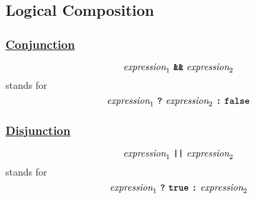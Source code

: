 \subsection*{Logical Composition}

\subsubsection*{\href{https://sourceacademy.org/sicpjs/1.1.6\#p4}{Conjunction}}

\[
\textit{expression}_1 \ \textbf{\texttt{\&\&}} \ \textit{expression}_2
\]
stands for
\[
\textit{expression}_1 \ \textbf{\texttt{?}} \ \textit{expression}_2 \ \textbf{\texttt{:}}\ \textbf{\texttt{false}}
\]

\subsubsection*{\href{https://sourceacademy.org/sicpjs/1.1.6\#p4}{Disjunction}}

\[
\textit{expression}_1 \ \textbf{\texttt{||}} \ \textit{expression}_2
\]
stands for
\[
\textit{expression}_1 \ \textbf{\texttt{?}}\ \textbf{\texttt{true}}\  \textbf{\texttt{:}}\ \textit{expression}_2
\]



